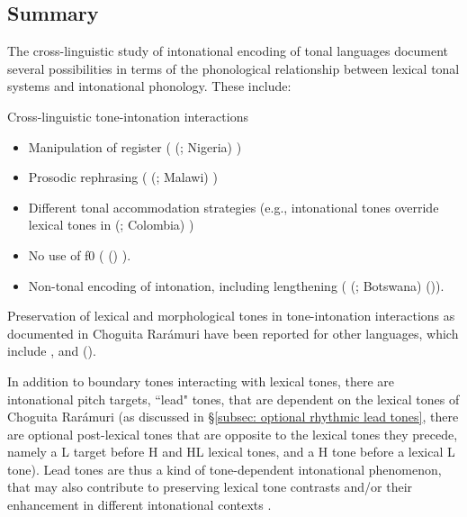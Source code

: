 \subsection{Summary}
\label{subsec: summary tone-intonation}

The cross-linguistic study of intonational encoding of tonal languages document several possibilities in terms of the phonological relationship between lexical tonal systems and intonational phonology. These include:

\ea\label{ex: cross-linguistic tone-intonation}
{Cross-linguistic tone-intonation interactions}
\begin{itemize}
\item Manipulation of register ( (; Nigeria) \parencite{inkelas1987phonology})
\item Prosodic rephrasing ( (; Malawi) \parencite{downing2007focus})
\item Different tonal accommodation strategies (e.g., intonational tones override lexical tones in  (; Colombia) \parencite{gralow1985coreguaje})
\item No use of f0 ( () \parencite{mcdonough2001intonation}).
\item Non-tonal encoding of intonation, including lengthening ( (; Botswana) (\citealt{hyman2011tonal})).
\end{itemize}
\z

Preservation of lexical and morphological tones in tone-intonation interactions as documented in Choguita Rarámuri have been  reported for other languages,  which include  \citep{godjevac2006transcribing},  \parencite{riad2006scandinavian} and  (\citealt{remijsen2005stress}).

In addition to boundary tones interacting with lexical tones, there are intonational pitch targets, ``lead" tones, that are dependent on the lexical tones of Choguita Rarámuri (as discussed in §\ref{subsec: optional rhythmic lead tones}, there are optional post-lexical tones that are opposite to the lexical tones they precede, namely a L target before H and HL lexical tones, and a H tone before a lexical L tone). Lead tones are thus a kind of tone-dependent intonational phenomenon, that may also contribute to preserving lexical tone contrasts and/or their enhancement in different intonational contexts \parencite{garellek2015lexical}.

